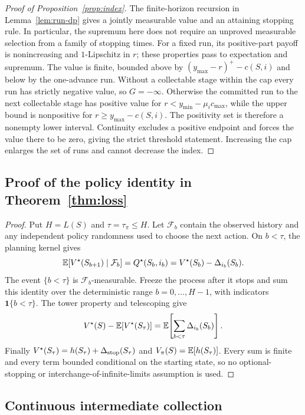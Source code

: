 \begin{proof}[Proof of Proposition~\ref{prop:index}]
The finite-horizon recursion in Lemma~\ref{lem:run-dp} gives a jointly measurable value and
an attaining stopping rule. In particular, the supremum here does not require an unproved
measurable selection from a family of stopping times.
For a fixed run, its positive-part payoff is nonincreasing and $1$-Lipschitz in $r$; these
properties pass to expectation and supremum. The value is finite, bounded above by
$(y_{\max}-r)^+-c(S,i)$ and below by the one-advance run. Without a collectable stage within
the cap every run has strictly negative value, so $G=-\infty$. Otherwise the committed run to
the next collectable stage has positive value for $r<y_{\min}-\mu_i c_{\max}$, while the upper
bound is nonpositive for $r\ge y_{\max}-c(S,i)$. The positivity set is therefore a nonempty
lower interval. Continuity excludes a positive endpoint and forces the value there to be zero,
giving the strict threshold statement.
Increasing the cap enlarges the set of runs and cannot decrease the index.
\end{proof}

\subsection{Proof of the policy identity in Theorem~\ref{thm:loss}}
\label{app:loss-proof}

\begin{proof}
Put $H=L(S)$ and $\tau=\tau_\pi\le H$. Let $\mathcal F_b$ contain the observed
history and any independent policy randomness used to choose the next action. On $b<\tau$,
the planning kernel gives
\[
\mathbb{E}[V^\star(S_{b+1})\mid\mathcal F_b]=Q^\star(S_b,i_b)
=V^\star(S_b)-\Delta_{i_b}(S_b).
\]
The event $\{b<\tau\}$ is $\mathcal F_b$-measurable. Freeze the process after it stops and
sum this identity over the deterministic range $b=0,\ldots,H-1$, with indicators
$\mathbf1\{b<\tau\}$. The tower property and telescoping give
\[
V^\star(S)-\mathbb{E}[V^\star(S_\tau)]
=\mathbb{E}\!\left[\sum_{b<\tau}\Delta_{i_b}(S_b)\right].
\]
Finally $V^\star(S_\tau)=h(S_\tau)+\Delta_{\rm stop}(S_\tau)$ and
$V_\pi(S)=\mathbb{E}[h(S_\tau)]$. Every sum is finite and every term bounded conditional on the
starting state, so no optional-stopping or interchange-of-infinite-limits assumption is used.
\end{proof}

\subsection{Continuous intermediate collection}

